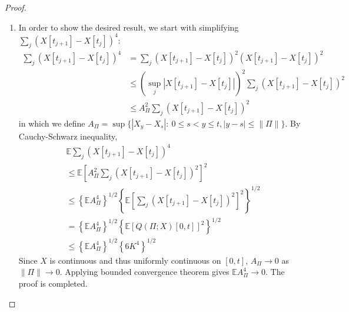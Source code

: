 \begin{proof}
\begin{enumerate}
\begin{align*}
\right\}
\right]\\
\le&\mathbb{E}\left[
\sum_k(X[t_{k+1}] - X[t_k])^2K^2
\right]\le K^4.
\end{align*}
 Then we upper bound the first term in (\ref{Eq:11:5}):
\begin{align*}
&\mathbb{E}\bigg[
\sum_j(X[t_{j+1}] - X[t_j])^4
\bigg]\\
=&\mathbb{E}\bigg[
\sum_j(X[t_{j+1}] - X[t_j])^2(X[t_{j+1}] - X[t_j])^2
\bigg]\\
\le&\mathbb{E}\bigg[
\sum_j4K^2(X[t_{j+1}] - X[t_j])^2
\bigg]\le 4K^4,
\end{align*}
where the first inequality is because $\mathbb{E}\left[
\sum_{j\ge1}(X[t_{j+1}] - X[t_j])^2
\right]\le K^2$.
Then we can assert that $\mathbb{E}\left[Q(\Pi;X)[0,t]\right]^2\le 6K^4$.
\item
In order to show the desired result, we start with simplifying $\sum_j(X[t_{j+1}] - X[t_j])^4$:
\begin{align*}
\sum_j(X[t_{j+1}] - X[t_j])^4&=\sum_j(X[t_{j+1}] - X[t_j])^2(X[t_{j+1}] - X[t_j])^2\\
&\le \left(\sup_j|X[t_{j+1}] - X[t_j]|\right)^2\sum_j(X[t_{j+1}] - X[t_j])^2\\
&\le A_{\Pi}^2\sum_j(X[t_{j+1}] - X[t_j])^2
\end{align*}
in which we define $A_{\Pi}=\sup\{|X_y-X_s|:~0\le s<y\le t, |y-s|\le\|\Pi\|\}$.
By Cauchy-Schwarz inequality,
\begin{align*}
&\mathbb{E}\sum_j(X[t_{j+1}] - X[t_j])^4\\&\le \mathbb{E}\left[A_{\Pi}^2\sum_j(X[t_{j+1}] - X[t_j])^2\right]^2\\
&\le \left\{\mathbb{E}A_{\Pi}^4\right\}^{1/2}\left\{
\mathbb{E}\left[\sum_j(X[t_{j+1}] - X[t_j])^2\right]^2
\right\}^{1/2}\\
&=\left\{\mathbb{E}A_{\Pi}^4\right\}^{1/2}\left\{
\mathbb{E}\left[Q(\Pi;X)[0,t]\right]^2
\right\}^{1/2}\\
&\le \left\{\mathbb{E}A_{\Pi}^4\right\}^{1/2}\left\{
6K^4
\right\}^{1/2}
\end{align*}
Since $X$ is continuous and thus uniformly continuous on $[0,t]$, $A_{\Pi}\to0$ as $\|\Pi\|\to0$.
Applying bounded convergence theorem gives $\mathbb{E}A_{\Pi}^4\to0$.
The proof is completed.
\end{enumerate}
\end{proof}


